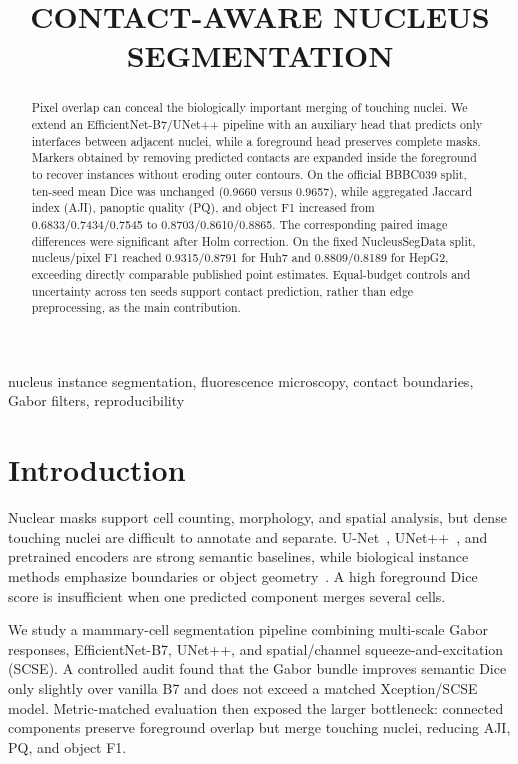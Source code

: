 \documentclass{article}
\title{CONTACT-AWARE NUCLEUS SEGMENTATION}
\begin{document}
\maketitle

\begin{abstract}
Pixel overlap can conceal the biologically important merging of touching nuclei. We extend an EfficientNet-B7/UNet++ pipeline with an auxiliary head that predicts only interfaces between adjacent nuclei, while a foreground head preserves complete masks. Markers obtained by removing predicted contacts are expanded inside the foreground to recover instances without eroding outer contours. On the official BBBC039 split, ten-seed mean Dice was unchanged (0.9660 versus 0.9657), while aggregated Jaccard index (AJI), panoptic quality (PQ), and object F1 increased from 0.6833/0.7434/0.7545 to 0.8703/0.8610/0.8865. The corresponding paired image differences were significant after Holm correction. On the fixed NucleusSegData split, nucleus/pixel F1 reached 0.9315/0.8791 for Huh7 and 0.8809/0.8189 for HepG2, exceeding directly comparable published point estimates. Equal-budget controls and uncertainty across ten seeds support contact prediction, rather than edge preprocessing, as the main contribution.
\end{abstract}
\begin{keywords}
nucleus instance segmentation, fluorescence microscopy, contact boundaries, Gabor filters, reproducibility
\end{keywords}

\section{Introduction}
Nuclear masks support cell counting, morphology, and spatial analysis, but dense touching nuclei are difficult to annotate and separate. U-Net~\cite{ronneberger2015unet}, UNet++~\cite{zhou2018unetpp}, and pretrained encoders are strong semantic baselines, while biological instance methods emphasize boundaries or object geometry~\cite{caicedo2019evaluation,wang2022aswnet,yi2022segmentgraph}. A high foreground Dice score is insufficient when one predicted component merges several cells.

We study a mammary-cell segmentation pipeline combining multi-scale Gabor responses, EfficientNet-B7, UNet++, and spatial/channel squeeze-and-excitation (SCSE). A controlled audit found that the Gabor bundle improves semantic Dice only slightly over vanilla B7 and does not exceed a matched Xception/SCSE model. Metric-matched evaluation then exposed the larger bottleneck: connected components preserve foreground overlap but merge touching nuclei, reducing AJI, PQ, and object F1.
\end{document}
